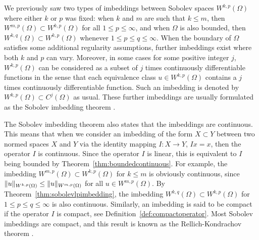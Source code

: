 \documentclass[english, 12pt, a4paper, sci, utf8, a-2b, online]{aaltothesis}
\theoremstyle{definition}
\theoremstyle{plain}
\DeclarePairedDelimiter\norm{\lVert}{\rVert}
\numberwithin{equation}{section}
\begin{document}
We previously saw two types of imbeddings between Sobolev spaces $W^{k,p}(\Omega)$
where either $k$ or $p$ was fixed:
when $k$ and $m$ are such that $k \leq m$, then
$W^{m,p}(\Omega) \subset W^{k,p}(\Omega)$ for all $1 \leq p \leq \infty$,
and when $\Omega$ is also bounded, then $W^{k,q}(\Omega) \subset W^{k,p}(\Omega)$
whenever $1 \leq p \leq q \leq \infty$.
When the boundary of $\Omega$ satisfies some additional regularity
assumptions, further imbeddings exist where both $k$ and $p$ can vary.
Moreover, in some cases for some positive integer $j$,
$W^{k,p}(\Omega)$ can be considered as a subset of
$j$ times continuously differentiable functions
in the sense that each 
equivalence class $u \in W^{k,p}(\Omega)$ contains
a $j$ times continuously differentiable function.
Such an imbedding is denoted by
$W^{k,p}(\Omega) \subset C^j(\Omega)$ as usual. These further imbeddings
are usually formulated as the Sobolev imbedding theorem \cite{adams2003}.

The Sobolev imbedding theorem also states that the imbeddings are continuous.
This means that when we consider an imbedding of the form $X \subset Y$
between two normed spaces $X$ and $Y$ via the identity mapping
$I: X \to Y$, $Ix = x$, then the operator $I$ is continuous.
Since the operator $I$ is linear, this is equivalent to $I$ being bounded
by Theorem~\ref{thm:boundedcontinuous}. For example, the imbedding
$W^{m,p}(\Omega) \subset W^{k,p}(\Omega)$ for $k \leq m$ is obviously
continuous, since $\norm{u}_{W^{k,p}(\Omega)} \leq \norm{u}_{W^{m,p}(\Omega)}$
for all $u \in W^{m,p}(\Omega)$. By Theorem~\ref{thm:sobolevlpimbedding},
the imbedding $W^{k,q}(\Omega) \subset W^{k,p}(\Omega)$ for
$1 \leq p \leq q \leq \infty$ is also continuous.
Similarly, an imbedding is said to be compact if the operator $I$ is compact,
see Definition~\ref{def:compactoperator}. Most Sobolev imbeddings are
compact, and this result is known as the Rellich-Kondrachov theorem 
\cite{adams2003}.
\end{document}
